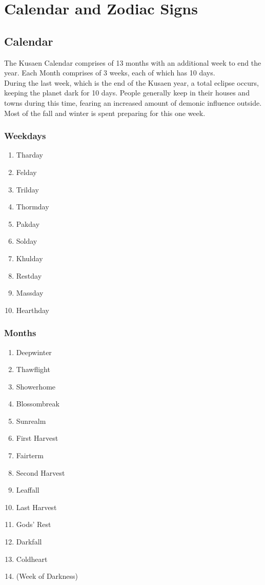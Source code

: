 \chapter{Calendar and Zodiac Signs}
\section{Calendar}
The Kusaen Calendar comprises of 13 months with an additional week to end the year. Each Month comprises of 3 weeks, each of which has 10 days.\\
During the last week, which is the end of the Kusaen year, a total eclipse occurs, keeping the planet dark for 10 days. People generally keep in their houses and towns during this time, fearing an increased amount of demonic influence outside. Most of the fall and winter is spent preparing for this one week.\\
\subsection{Weekdays}
\begin{enumerate}
	\item Tharday
	\item Felday
	\item Trilday
	\item Thormday
	\item Pakday
	\item Solday
	\item Khulday
	\item Restday
	\item Massday
	\item Hearthday
\end{enumerate}


\subsection{Months}
\begin{enumerate}
	\item Deepwinter
	\item Thawflight
	\item Showerhome
	\item Blossombreak
	\item Sunrealm
	\item First Harvest
	\item Fairterm
	\item Second Harvest
	\item Leaffall
	\item Last Harvest
	\item Gods' Rest
	\item Darkfall
	\item Coldheart
	\item (Week of Darkness)
\end{enumerate}


